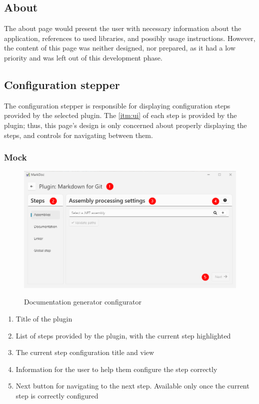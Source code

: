 \subsection{About}

The about page would present the user with necessary information about the application, references to used libraries, and possibly usage instructions. However, the content of this page was neither designed, nor prepared, as it had a low priority and was left out of this development phase.

\subsection{Configuration stepper}

The configuration stepper is responsible for displaying configuration steps provided by the selected plugin. The \ref{itm:ui} of each step is provided by the plugin; thus, this page's design is only concerned about properly displaying the steps, and controls for navigating between them.

\subsubsection{Mock}

\begin{figure}[H]
    \includegraphics[width=\linewidth]{img/markDocConfigurator.png}
    \label{fig:configuratorPage}
    \caption{Documentation generator configurator}
\end{figure}

\begin{enumerate}
    \item Title of the plugin
    \item List of steps provided by the plugin, with the current step highlighted
    \item The current step configuration title and view
    \item Information for the user to help them configure the step correctly
    \item Next button for navigating to the next step. Available only once the current step is correctly configured
\end{enumerate}


